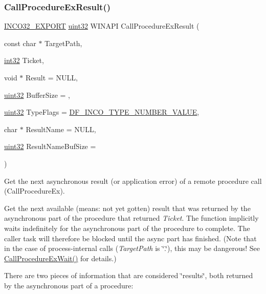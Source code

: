 \subsubsection{\texorpdfstring{Call\+Procedure\+Ex\+Result()}{CallProcedureExResult()}}
{\footnotesize\ttfamily \hyperlink{inco__32_8h_a09505cad5bbb66fc36750a4fbca0444b}{I\+N\+C\+O32\+\_\+\+E\+X\+P\+O\+RT} \hyperlink{indeltypes_8h_a4b435a49c74bb91f284f075e63416cb6}{uint32} W\+I\+N\+A\+PI Call\+Procedure\+Ex\+Result (\begin{DoxyParamCaption}\item[{const char $\ast$}]{Target\+Path,  }\item[{\hyperlink{indeltypes_8h_ac44d0188f4f50fd9b03031c1a06bd0a9}{int32}}]{Ticket,  }\item[{void $\ast$}]{Result = {\ttfamily NULL},  }\item[{\hyperlink{indeltypes_8h_a4b435a49c74bb91f284f075e63416cb6}{uint32}}]{Buffer\+Size = {},  }\item[{\hyperlink{indeltypes_8h_a4b435a49c74bb91f284f075e63416cb6}{uint32}}]{Type\+Flags = {\ttfamily \hyperlink{indeldefs_8h_a0f27c7a63f462a5f51c285c85d7a5cac}{D\+F\+\_\+\+I\+N\+C\+O\+\_\+\+T\+Y\+P\+E\+\_\+\+N\+U\+M\+B\+E\+R\+\_\+\+V\+A\+L\+UE}},  }\item[{char $\ast$}]{Result\+Name = {\ttfamily NULL},  }\item[{\hyperlink{indeltypes_8h_a4b435a49c74bb91f284f075e63416cb6}{uint32}}]{Result\+Name\+Buf\+Size = {} }\end{DoxyParamCaption})}



Get the next asynchronous result (or application error) of a remote procedure call (Call\+Procedure\+Ex). 

Get the next available (means\+: not yet gotten) result that was returned by the asynchronous part of the procedure that returned {\itshape Ticket}. The function implicitly waits indefinitely for the asynchronous part of the procedure to complete. The caller task will therefore be blocked until the async part has finished. (Note that in the case of process-\/internal calls ({\itshape Target\+Path} is \char`\"{}.\char`\"{}), this may be dangerous! See \hyperlink{group__commonfunctions_ga1b55ca711acd0dcc672e5fefe5cff27e}{Call\+Procedure\+Ex\+Wait()} for details.)

There are two pieces of information that are considered \char`\"{}results\char`\"{}, both returned by the asynchronous part of a procedure\+:


